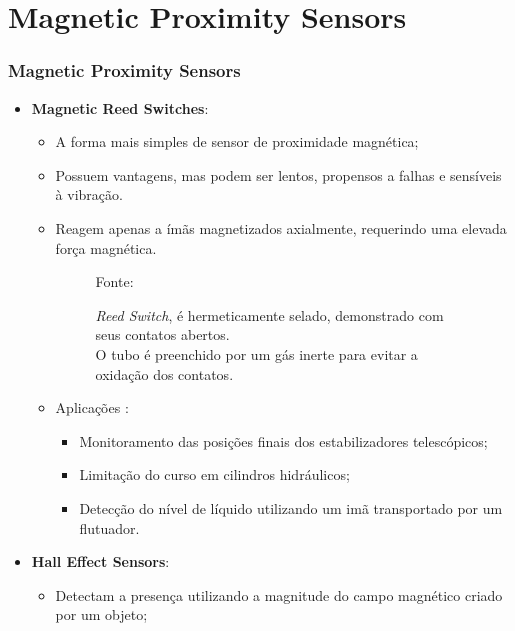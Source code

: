 \documentclass[xcolor=dvipsnames, aspectratio=169]{beamer}
\begin{document}
\section[Magnetic Proximity Sensors]{Magnetic Proximity Sensors} 
\begin{frame}
\frametitle{Magnetic Proximity Sensors}
	\begin{itemize}
		\item \textbf{Magnetic Reed Switches}:
		\begin{itemize}
			\item A forma mais simples de sensor de proximidade magnética;
			\item Possuem vantagens, mas podem ser lentos, propensos a falhas e sensíveis à vibração. 
			\item Reagem apenas a ímãs magnetizados axialmente, requerindo uma elevada força magnética.
			\begin{figure}
                \centering
                {Fonte: \cite{everett1995sensors}}
                \caption{\textit{Reed Switch}, é hermeticamente selado, demonstrado com seus contatos abertos.\\ O tubo é preenchido por um gás inerte para evitar a oxidação dos contatos.}
                \label{fig:1_reed_switch}
            \end{figure}
			\item Aplicações \cite{baumermagnetic}:
			\begin{itemize}
				\item Monitoramento das posições finais dos estabilizadores telescópicos;
				\item Limitação do curso em cilindros hidráulicos;
				\item Detecção do nível de líquido utilizando um imã transportado por um flutuador.
			\end{itemize}
		\newpage
		\end{itemize}
		\item \textbf{Hall Effect Sensors}:
		\begin{itemize}
			\item Detectam a presença utilizando a magnitude do campo magnético criado por um objeto;

\end{itemize}
\end{itemize}
\end{frame}
\end{document}
